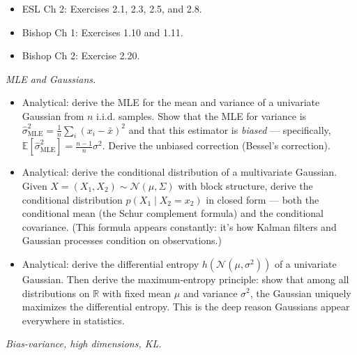 \begin{itemize}
\tightlist
\item
  ESL Ch 2: Exercises 2.1, 2.3, 2.5, and 2.8.
\item
  Bishop Ch 1: Exercises 1.10 and 1.11.
\item
  Bishop Ch 2: Exercise 2.20.
\end{itemize}

\emph{MLE and Gaussians.}

\begin{itemize}
\tightlist
\item
  Analytical: derive the MLE for the mean and variance of a univariate
  Gaussian from \(n\) i.i.d. samples. Show that the MLE for variance is
  \(\hat{\sigma}^2_{\text{MLE}} = \tfrac{1}{n} \sum_i (x_i - \bar{x})^2\)
  and that this estimator is \emph{biased} --- specifically,
  \(\mathbb{E}[\hat{\sigma}^2_{\text{MLE}}] = \tfrac{n-1}{n} \sigma^2\).
  Derive the unbiased correction (Bessel's correction).
\item
  Analytical: derive the conditional distribution of a multivariate
  Gaussian. Given \(X = (X_1, X_2) \sim \mathcal{N}(\mu, \Sigma)\) with
  block structure, derive the conditional distribution
  \(p(X_1 \mid X_2 = x_2)\) in closed form --- both the conditional mean
  (the Schur complement formula) and the conditional covariance. (This
  formula appears constantly: it's how Kalman filters and Gaussian
  processes condition on observations.)
\item
  Analytical: derive the differential entropy
  \(h(\mathcal{N}(\mu, \sigma^2))\) of a univariate Gaussian. Then
  derive the maximum-entropy principle: show that among all
  distributions on \(\mathbb{R}\) with fixed mean \(\mu\) and variance
  \(\sigma^2\), the Gaussian uniquely maximizes the differential
  entropy. This is the deep reason Gaussians appear everywhere in
  statistics.
\end{itemize}

\emph{Bias-variance, high dimensions, KL.}

